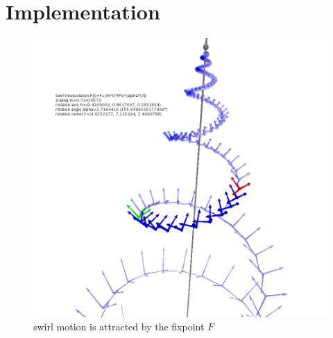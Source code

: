 \documentclass[tikz, journal, letterpaper]{IEEEtran}
\begin{document}
\section{Implementation}

\begin{figure}
	\centering
		\includegraphics[scale=0.4]{pictures/P3.png}
	\caption{swirl motion is attracted by the fixpoint $F$}
	\label{fig:P3}
\end{figure}
\end{document}
